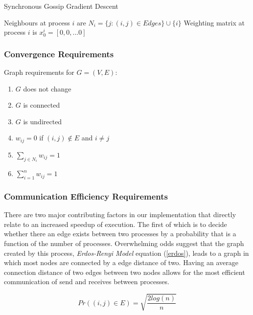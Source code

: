 \documentclass{article}
\theoremstyle{definition}
\begin{document}
{\begin{algorithm}[!ht]
    \SetAlgoLined
    \caption{Synchronous Gossip Gradient Descent}
    Neighbours at process $i$ are $N_i = \{j : (i,j)\in Edges\}\cup \{i\}$\;
    Weighting matrix at process $i$ is $x_0^i = [0, 0, ... 0]$\;
\end{algorithm}{

\subsubsection{Convergence Requirements}
Graph requirements for $G = (V, E)$:
\begin{enumerate}
    \item $G$ does not change
    \item $G$ is connected
    \item $G$ is undirected
    \item $w_{ij} = 0$ if $(i,j) \not\in E$ and $i \neq j$
    \item $\sum_{j\in N_i} w_{ij} = 1$ 
    \item $\sum_{i=1}^{n} w_{ij} = 1$
\end{enumerate}

\subsubsection{Communication Efficiency Requirements}
There are two major contributing factors in our implementation that directly relate to an increased speedup of execution. The first of which is to decide whether there an edge exists between two processes by a probability that is a function of the number of processes. Overwhelming odds suggest that the graph created by this process, \textit{Erdos-Renyi Model} equation (\ref{erdos}), leads to a graph in which most nodes are connected by a edge distance of two. Having an average connection distance of two edges between two nodes allows for the most efficient communication of send and receives between processes.

\begin{equation}
    \label{erdos}
    Pr((i,j) \in E) = \sqrt{\frac{2log(n)}{n}}
\end{equation}

}}
\end{document}
